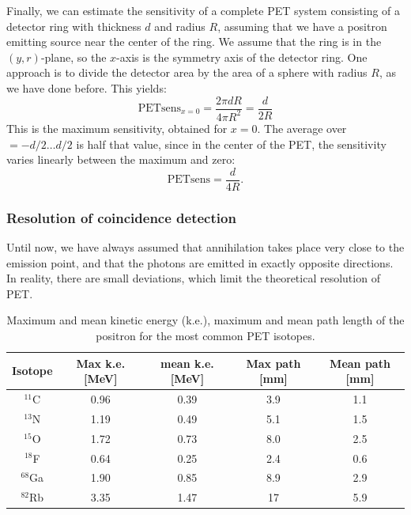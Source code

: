 \documentclass[11pt,oneside]{book}
\begin{document}
Finally, we can estimate the sensitivity of a complete PET system consisting
of a detector ring with thickness $d$ and radius $R$, assuming that we have a
positron emitting source near the center of the ring. We assume that the ring
is in the $(y,r)$-plane, so the $x$-axis is the symmetry axis of the detector
ring.  One approach is to divide the detector area by the area of a sphere
with radius $R$, as we have done before. This yields:
\begin{equation}
  \mbox{PETsens}_{x=0} = \frac{2 \pi d R}{ 4 \pi R^2} = \frac{d}{2R}
\end{equation}
This is the maximum sensitivity, obtained for $x = 0$. The average over $ =
-d/2 \ldots d/2$ is half that value, since in the center of the PET, the
sensitivity varies linearly between the maximum and zero:
\begin{equation}
  \mbox{PETsens} = \frac{d}{4R}. \label{eq:petsens}
\end{equation}

\subsubsection{Resolution of coincidence detection}
Until now, we have always assumed that annihilation takes place very close to
the emission point, and that the photons are emitted in exactly opposite
directions. In reality, there are small deviations, which limit the
theoretical resolution of PET. 

\begin{table}
\caption{Maximum and mean kinetic energy (k.e.), maximum and mean path length
of the positron for the most common PET isotopes.}
\label{tab:positron_length}
\begin{center}
\begin{tabular}{|c|c|c|c|c|}
\hline
Isotope   & Max k.e. [MeV] & mean k.e. [MeV] & Max path [mm] & Mean path [mm]\\
\hline
$^{11}$C  & 0.96 & 0.39 & 3.9    & 1.1 \\
$^{13}$N  & 1.19 & 0.49 & 5.1    & 1.5 \\
$^{15}$O  & 1.72 & 0.73 & 8.0    & 2.5 \\
$^{18}$F  & 0.64 & 0.25 & 2.4    & 0.6 \\
$^{68}$Ga & 1.90 & 0.85 & 8.9    & 2.9 \\
$^{82}$Rb & 3.35 & 1.47 & 17     & 5.9 \\
\hline
\end{tabular}
\end{center}
\end{table}
\end{document}
